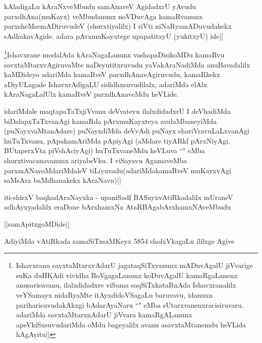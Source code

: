 \begin{artha}
kAladigaLu kAraNxveMbudu samAnaveV AgidadxrU yAvudu parxdhAna(muKayx) veMbudanunx noVDuvAga kamaRvanunx parxsheMsemADiruvudeV (shurxtiyalilx) I riVti niNaRyamADuvudakekx sAdhakavAgide. adara pArxmuKayxtege upapatitxyU (yukitxyU) ide||
\end{artha}


\begin{artha}
\footnote{Ishavxranu savxtaMtarxvAdarU jagataqSiTxyanunx mADuvAgalU jiVvarige suKa duHKAdi vividha BoVgagaLanunx koDuvAgalU kamaRgaLanenx anusarisuvanu, ilalxdidadxre viSama saqSiTxkataRnAda Ishavxranalilx veYSamayx nidaRyaMte itAyxdidoVSagaLu baruvavu, idanuxn pariharisuvudakAkxgi bAdarAyaNaru ``\stext" eMba sUtarxvanenxracisiruvaru. adariMda savxtaMtarxnAdarU jiVvara kamaRgALanunx apeVkiSxsuvudariMda oMdu bageyalilx avanu asavxtaMtanemdu heVLida hAgAyitu||}Ishavxrane modalAda kAraNagaLanunx vashapaDisikoMDu kamaRvu savxtaMtarxvAgiruvaMte naDeyutitxruvudu yaVakAraNadiMda anuBavadalilx kaMDideyo adariMda kamaRveV parxdhAnavAgiruvudu, kamaRkekx aDiyULagade IshavxrAdigaLU sididhxsuvudilalx, adariMda elAlx kAraNagaLalUlx kamaRveV parxdhAnaveMdu heVLide.
\end{artha}


\begin{artha}
idariMdale maqtapaTaTxjiVvanu deVvateyu ilalxdidadxrU I deVhadiMda biDalapxTaTxvanAgi kamaRda pArxmuKayxteya avalaMbaneyiMda (puNayxvaMtanAdare) puNayxdiMda deVvAdi puNayx shariVravuLaLxvanAgi huTuTxvanu, pApakamAriMda pApiyAgi (aMdare tiyARkf pArxNiyAgi, BUtaperxVta piVshAciyAgi) huTuTxvaneMdu heVLuva ``\stext" eMba shurxtivacanavanunx ariyabeVku. I viSayavu AgamaveMba parxmANavoMdariMdaleV tiLiyuvadu(adariMdakamaRveV muKayxvAgi saMsAra baMdhanakekx kAraNavu)||
\end{artha}

\begin{center}
iti-shirxV baqhadAraNayxka - upaniSadf BASayxvAtiRkadalilx mUraneV adhAyxyadalilx eraDane bArxhamxNa AtaRBAgabArxhamxNAveMbudu
\end{center}

\begin{center}
||samApitxgoMDide||
\end{center}

\begin{center}
AdiyiMda vAtiRkada samaSiTxsaMKeyx 5854 sholxVkagaLu ililxge Agive
\end{center}

